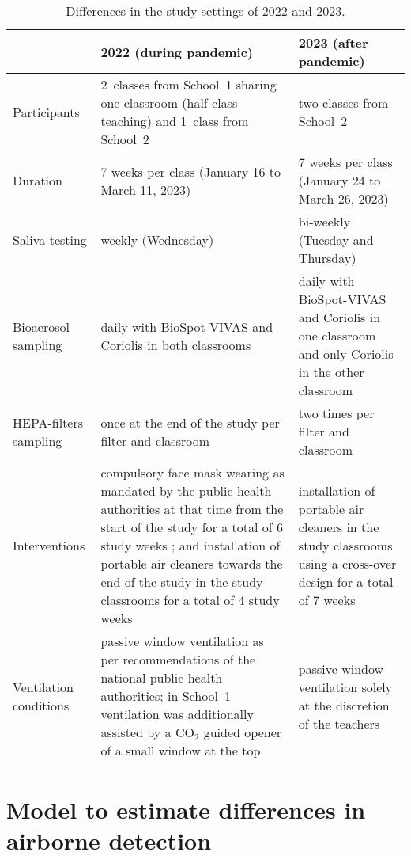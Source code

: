 \documentclass[fleqn,11pt]{wlscirep_supp}
\begin{document}
\begin{table}[!htpb]
    \caption{Differences in the study settings of 2022 and 2023.}
    \label{tab:comp_study}
    \centering
    \renewcommand{\arraystretch}{1.5}
    \begin{tabular}{lp{6cm}p{6cm}}
        \toprule
        & \textbf{2022 (during pandemic)} & \textbf{2023 (after pandemic)} \\
        \midrule
        Participants & 2~classes from School~1 sharing one classroom (half-class teaching) and 1~class from School~2 & two classes from School~2 \\
        Duration & 7 weeks per class (January 16 to March 11, 2023) & 7 weeks per class (January 24 to March 26, 2023) \\
        Saliva testing & weekly (Wednesday) & bi-weekly (Tuesday and Thursday) \\
        Bioaerosol sampling & daily with BioSpot-VIVAS and Coriolis in both classrooms & daily with BioSpot-VIVAS and Coriolis in one classroom and only Coriolis in the other classroom \\
        HEPA-filters sampling & once at the end of the study per filter and classroom & two times per filter and classroom \\
        Interventions & compulsory face mask wearing as mandated by the public health authorities at that time from the start of the study for a total of 6 study weeks ; and installation of portable air cleaners towards the end of the study in the study classrooms for a total of 4 study weeks & installation of portable air cleaners in the study classrooms using a cross-over design for a total of 7 weeks \\
        Ventilation conditions & passive window ventilation as per recommendations of the national public health authorities; in School~1 ventilation was additionally assisted by a CO$_2$ guided opener of a small window at the top & passive window ventilation solely at the discretion of the teachers \\
        \bottomrule
    \end{tabular}
\end{table}

\clearpage

\section{Model to estimate differences in airborne detection}\label{sec:model}
\end{document}
